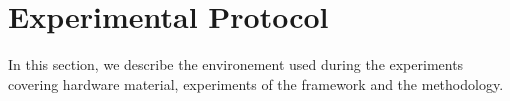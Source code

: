 

\newcommand\duration{20}
\newcommand\parallelclient{512}
\section{Experimental Protocol}

In this section, we describe the environement used during the experiments covering hardware material, experiments of the framework and the methodology.

